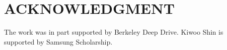 \documentclass[letterpaper, 10 pt, conference]{ieeeconf}
\begin{document}
\section*{ACKNOWLEDGMENT}
The work was in part supported by Berkeley Deep Drive. Kiwoo Shin is supported by Samsung Scholarship.

\newpage



\end{document}
